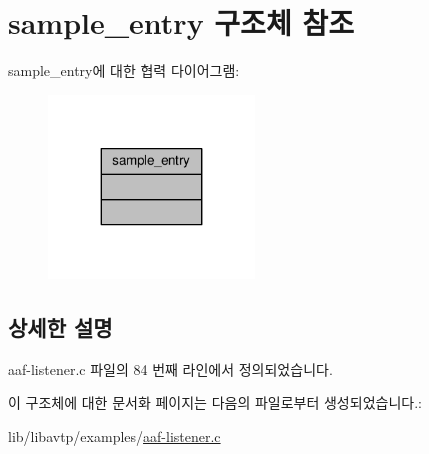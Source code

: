 \hypertarget{structsample__entry}{}\section{sample\+\_\+entry 구조체 참조}
\label{structsample__entry}


sample\+\_\+entry에 대한 협력 다이어그램\+:
\nopagebreak
\begin{figure}[H]
\begin{center}
\leavevmode
\includegraphics[width=155pt]{structsample__entry__coll__graph}
\end{center}
\end{figure}


\subsection{상세한 설명}


aaf-\/listener.\+c 파일의 84 번째 라인에서 정의되었습니다.



이 구조체에 대한 문서화 페이지는 다음의 파일로부터 생성되었습니다.\+:\begin{DoxyCompactItemize}
\item 
lib/libavtp/examples/\hyperlink{aaf-listener_8c}{aaf-\/listener.\+c}\end{DoxyCompactItemize}

